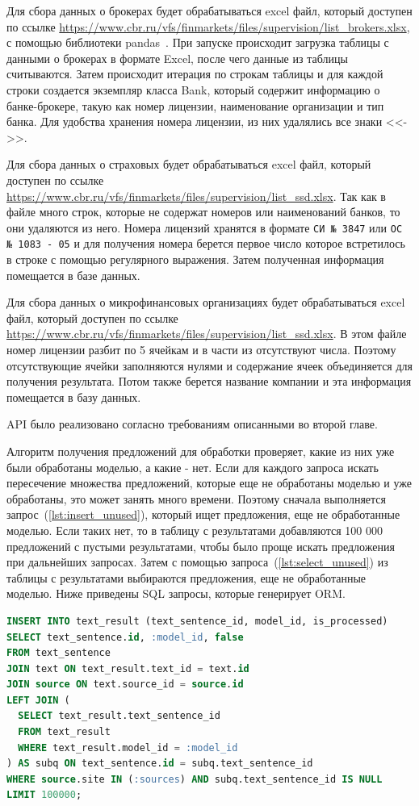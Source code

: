 \documentclass[PI, VKR]{HSEUniversity}
\begin{document}
Для сбора данных о брокерах будет обрабатываться excel файл, который доступен по ссылке \url{https://www.cbr.ru/vfs/finmarkets/files/supervision/list\_brokers.xlsx}, с помощью библиотеки pandas~\autocite{team_pandasdev_2023}. При запуске происходит загрузка таблицы с данными о брокерах в формате Excel, после чего данные из таблицы считываются. Затем происходит итерация по строкам таблицы и для каждой строки создается экземпляр класса Bank, который содержит информацию о банке-брокере, такую как номер лицензии, наименование организации и тип банка. Для удобства хранения номера лицензии, из них удалялись все знаки {}<<->>{}.

Для сбора данных о страховых будет обрабатываться excel файл, который доступен по ссылке \url{https://www.cbr.ru/vfs/finmarkets/files/supervision/list\_ssd.xlsx}. Так как в файле много строк, которые не содержат номеров или наименований банков, то они удаляются из него. Номера лицензий хранятся в формате \texttt{СИ № 3847} или \texttt{ОС № 1083 - 05} и для получения номера берется первое число которое встретилось в строке с помощью регулярного выражения. Затем полученная информация помещается в базе данных.

Для сбора данных о микрофинансовых организациях будет обрабатываться excel файл, который доступен по ссылке \url{https://www.cbr.ru/vfs/finmarkets/files/supervision/list\_ssd.xlsx}. В этом файле номер лицензии разбит по 5 ячейкам и в части из отсутствуют числа. Поэтому отсутствующие ячейки заполняются нулями и содержание ячеек объединяется для получения результата. Потом также берется название компании и эта информация помещается в базу данных.

API было реализовано согласно требованиям описанными во второй главе.

Алгоритм получения предложений для обработки проверяет, какие из них уже были обработаны моделью, а какие - нет. Если для каждого запроса искать пересечение множества предложений, которые еще не обработаны моделью и уже обработаны, это может занять много времени. Поэтому сначала выполняется запрос~(\ref{lst:insert_unused}), который ищет предложения, еще не обработанные моделью. Если таких нет, то в таблицу с результатами добавляются 100 000 предложений с пустыми результатами, чтобы было проще искать предложения при дальнейших запросах. Затем с помощью запроса~(\ref{lst:select_unused}) из таблицы с результатами выбираются предложения, еще не обработанные моделью. Ниже приведены SQL запросы, которые генерирует ORM.

\begin{lstlisting}[language=SQL,label=lst:insert_unused,caption={SQL запрос на вставку не обработанных предложений},captionpos=b,numbers=none]
INSERT INTO text_result (text_sentence_id, model_id, is_processed)
SELECT text_sentence.id, :model_id, false
FROM text_sentence
JOIN text ON text_result.text_id = text.id
JOIN source ON text.source_id = source.id
LEFT JOIN (
  SELECT text_result.text_sentence_id
  FROM text_result
  WHERE text_result.model_id = :model_id
) AS subq ON text_sentence.id = subq.text_sentence_id
WHERE source.site IN (:sources) AND subq.text_sentence_id IS NULL
LIMIT 100000;
\end{lstlisting}
\end{document}
